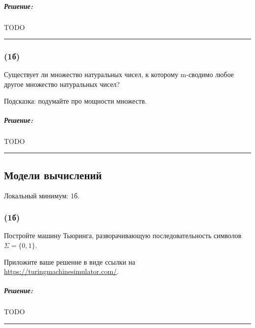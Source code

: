 \documentclass{article}
\newenvironment{proof}{\subparagraph{\hspace{-1em}Решение:\newline}}{\par\noindent\rule{\textwidth}{0.4pt}}
\begin{document}
    \begin{proof}
        TODO %
    \end{proof}

    \subsubsection{(1б)}

    Существует ли множество натуральных чисел, к которому m-сводимо любое другое множество натуральных чисел?

    Подсказка: подумайте про мощности множеств.

    \begin{proof}
        TODO %
    \end{proof}

    \subsection{Модели вычислений}

    Локальный минимум: 1б.

    \subsubsection{(1б)}

    Постройте машину Тьюринга, разворачивающую последовательность символов $\Sigma = \{0, 1\}$.

    Приложите ваше решение в виде ссылки на \url{https://turingmachinesimulator.com/}.

    \begin{proof}
        TODO %
    \end{proof}
\end{document}

